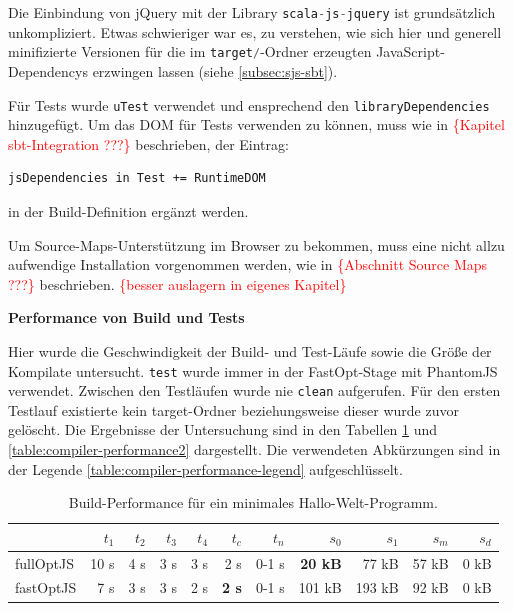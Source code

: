 \documentclass[a4paper, 12pt, hidelinks, listof=totoc, listoftables=totoc, bibliography=totoc]{scrreprt}
\newcommand{\code}[1]{\lstinline[language=Scala, style=inline]|#1|}
\newcommand{\TODOi}[1]{\textcolor{red}{\{#1\}}}
\newcommand{\MyMiniSec}[1]{\rmfamily\fontsize{12}{15}\selectfont
	\vspace{7pt}\textbf{#1} %
}
\begin{document}
Die Einbindung von jQuery mit der Library \code{scala-js-jquery} ist grundsätzlich unkompliziert. Etwas schwieriger war es, zu verstehen, wie sich hier und generell minifizierte Versionen für die im \code{target/}-Ordner erzeugten JavaScript-Dependencys erzwingen lassen (siehe \ref{subsec:sjs-sbt}).




Für Tests wurde \code{uTest} verwendet und ensprechend den \code{libraryDependencies} hinzugefügt. Um das \ac{DOM} für Tests verwenden zu können, muss wie in \TODOi{Kapitel sbt-Integration ???} beschrieben, der Eintrag:

\begin{lstlisting}[style=snippet]
jsDependencies in Test += RuntimeDOM
\end{lstlisting}
in der Build-Definition ergänzt werden.

Um Source-Maps-Unterstützung im Browser zu bekommen, muss eine nicht allzu aufwendige Installation vorgenommen werden, wie in \TODOi{Abschnitt Source Maps ???} beschrieben. \TODOi{besser auslagern in eigenes Kapitel}

\MyMiniSec{Performance von Build und Tests}

Hier wurde die Geschwindigkeit der Build- und Test-Läufe sowie die Größe der Kompilate untersucht. \code{test} wurde immer in der FastOpt-Stage mit PhantomJS verwendet. Zwischen den Testläufen wurde nie \code{clean} aufgerufen. Für den ersten Testlauf existierte kein target-Ordner beziehungsweise dieser wurde zuvor gelöscht. Die Ergebnisse der Untersuchung sind in den Tabellen \ref{table:compiler-performance1} und \ref{table:compiler-performance2} dargestellt. Die verwendeten Abkürzungen sind in der Legende \ref{table:compiler-performance-legend} aufgeschlüsselt.

\medskip

\begin{table}[!h]
\begin{tabular}{|l|r|r|r|r|r|r||r|r|r|r|}
\hline           & $t_1$ & $t_2$ & $t_3$ & $t_4$ & $t_c$         & $t_n$ & $s_0$          & $s_1$  & $s_m$ & $s_d$ \\ 
\hline fullOptJS & 10 s  &  4 s  &  3 s  &  3 s  &          2 s  & 0-1 s & \textbf{20 kB} &  77 kB & 57 kB &  0 kB \\ 
\hline fastOptJS &  7 s  &  3 s  &  3 s  &  2 s  &  \textbf{2 s} & 0-1 s &        101 kB  & 193 kB & 92 kB &  0 kB \\ 
\hline 
\end{tabular} 
\caption{Build-Performance für ein minimales Hallo-Welt-Programm.}
\label{table:compiler-performance1}
\end{table}
\end{document}
